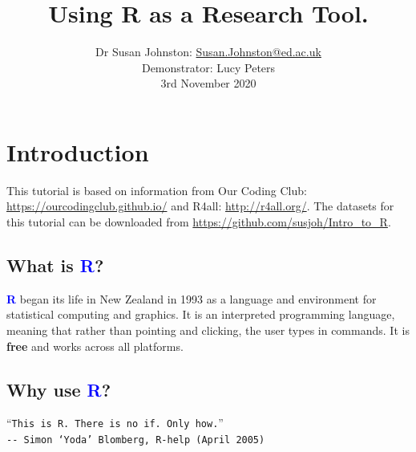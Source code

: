 \documentclass[a4paper,12pt]{article}
\newcommand\boldblue[1]{\textcolor{blue}{\textbf{#1}}}
\begin{document}





\title{Using R as a Research Tool.}
\author{\small{Dr Susan Johnston: \href{mailto:Susan.Johnston@ed.ac.uk}{Susan.Johnston@ed.ac.uk}}  \\
        \small{Demonstrator: Lucy Peters} \\
        \small{3rd November 2020}}
    \date{}

\maketitle

\section {Introduction}

This tutorial is based on information from Our Coding Club: \url{https://ourcodingclub.github.io/} and R4all: \url{http://r4all.org/}. The datasets for this tutorial can be downloaded from \url{https://github.com/susjoh/Intro_to_R}.

\subsection {What is \boldblue{R}?}

\boldblue{R} began its life in New Zealand in 1993 as a language and environment for statistical computing and graphics. It is an interpreted programming language, meaning that rather than pointing and clicking, the user types in commands. It is \textbf{free} and works across all platforms.


\subsection {Why use \boldblue{R}?}

\begin{center}
``\texttt{This is R. There is no if. Only how.}'' \\
\texttt{{-}{-} Simon `Yoda' Blomberg, R-help (April 2005)}

\end{center}
\end{document}
